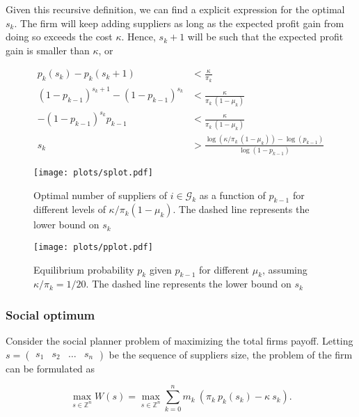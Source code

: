 \documentclass[american, abstract=on]{scrartcl}
\newcommand{\G}{\mathcal{G}}
\begin{document}
Given this recursive definition, we can find a explicit expression for the optimal $s_k$. The firm will keep adding suppliers as long as the expected profit gain from doing so exceeds the cost $\kappa$. Hence, $s_k + 1$ will be such that the expected profit gain is smaller than $\kappa$, or 

\begin{equation}
  \begin{split}
     p_k(s_k) - p_k(s_k + 1) &< \frac{\kappa}{\pi_k} \\
     (1 - p_{k-1})^{s_k + 1} - (1 - p_{k-1})^{s_k} &< \frac{\kappa}{\pi_k \ (1 - \mu_k)} \\
     -(1 - p_{k-1})^{s_k} p_{k-1}&< \frac{\kappa}{\pi_k \ (1 - \mu_k)} \\
     s_k &> \frac{\log(\kappa / \pi_k \ (1 - \mu_k)) - \log(p_{k-1})}{\log(1 - p_{k-1})}
  \end{split}
\end{equation}

\begin{figure}[H]
  \centering
  \texttt{[image: plots/splot.pdf]} 
  \caption{Optimal number of suppliers of $i \in \G_k$ as a function of $p_{k - 1}$ for different levels of $\kappa \Big/ \pi_k (1 - \mu_k)$. The dashed line represents the lower bound on $s_k$}
  \label{fig:splot}
\end{figure}

\begin{figure}[H]
  \centering
  \texttt{[image: plots/pplot.pdf]} 
  \caption{Equilibrium probability $p_k$ given $p_{k- 1}$ for different $\mu_k$, assuming $\kappa / \pi_k = 1/20$. The dashed line represents the lower bound on $s_k$}
  \label{fig:pplot}
\end{figure}

\subsubsection{Social optimum}

Consider the social planner problem of maximizing the total firms payoff. Letting $s = \begin{pmatrix} s_1 & s_2 & \ldots & s_n \end{pmatrix}$ be the sequence of suppliers size, the problem of the firm can be formulated as

\begin{equation}
  \max_{s \in \mathbb{Z}^n} W(s) = \max_{s \in \mathbb{Z}^n} \sum^n_{k = 0} m_k \ \left(\pi_k \ p_k(s_k) - \kappa \ s_k\right).
\end{equation}
\end{document}
